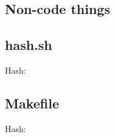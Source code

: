 \documentclass[10pt]{article}
\newcommand{\inputfile}[2]{
\subsection{#1}
Hash: \texttt{}

}
\begin{document}
\begin{multicols*}{3}
    \tableofcontents

    \clearpage

    \section{Non-code things}
    \inputfile{hash.sh}{txt}
    \inputfile{Makefile}{txt}

\end{multicols*}
\end{document}

